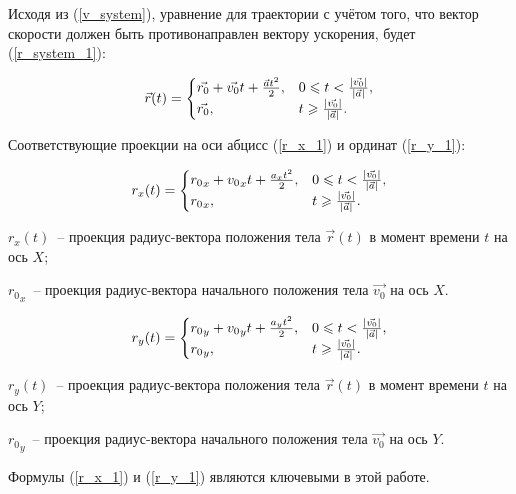 Исходя из (\ref{v_system}), уравнение для траектории с учётом того, что вектор скорости должен быть
противонаправлен вектору ускорения, будет (\ref{r_system_1}):

\begin{equation}\label{r_system_1}
  \vec{r}(t) = \begin{cases}
    \vec{r_0} + \vec{v_0}t + \frac{\vec{a}t^2}{2}, & 0 \leqslant t < \frac{\left|\vec{v_0}\right|}{\left|\vec{a}\right|}, \\
    \vec{r_0},                                             & t \geqslant \frac{\left|\vec{v_0}\right|}{\left|\vec{a}\right|} .
  \end{cases}
\end{equation}

Соответствующие проекции на оси абцисс (\ref{r_x_1}) и ординат (\ref{r_y_1}):

\begin{equation}\label{r_x_1}
  r_x(t) =
  \begin{cases}
    {r_0}_x + {v_0}_x t + \frac{a_x t^2}{2}, & 0 \leqslant t < \frac{\left|\vec{v_0}\right|}{\left|\vec{a}\right|}, \\
    {r_0}_x,               & t \geqslant \frac{\left|\vec{v_0}\right|}{\left|\vec{a}\right|}.
  \end{cases}
\end{equation}

\begin{Underequation}
  \(r_x(t)\)~-- проекция радиус-вектора положения тела \(\vec{r}(t)\) в момент времени \(t\) на ось \(X\); 

  \({r_0}_x\)~-- проекция радиус-вектора начального положения тела \(\vec{v_0}\) на ось \(X\). 
\end{Underequation}

\begin{equation}\label{r_y_1}
  r_y(t) =
  \begin{cases}
    {r_0}_y + {v_0}_y t + \frac{a_y t^2}{2}, & 0 \leqslant t < \frac{\left|\vec{v_0}\right|}{\left|\vec{a}\right|}, \\
    {r_0}_y,               & t \geqslant \frac{\left|\vec{v_0}\right|}{\left|\vec{a}\right|}.
  \end{cases}
\end{equation}

\begin{Underequation}
  \(r_y(t)\)~-- проекция радиус-вектора положения тела \(\vec{r}(t)\) в момент времени \(t\) на ось \(Y\); 

  \({r_0}_y\)~-- проекция радиус-вектора начального положения тела \(\vec{v_0}\) на ось \(Y\). 
\end{Underequation}

Формулы (\ref{r_x_1}) и (\ref{r_y_1}) являются ключевыми в этой работе.
